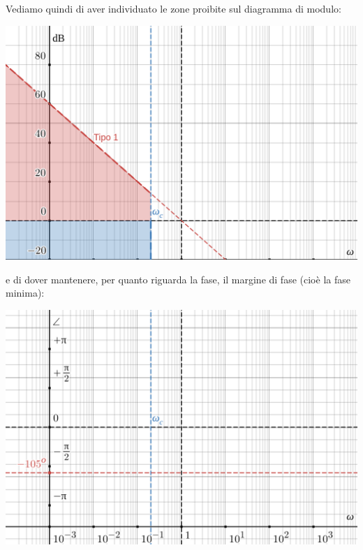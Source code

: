 \documentclass[a4paper,11pt]{article}
\begin{document}
Vediamo quindi di aver individuato le zone proibite sul diagramma di modulo:
\begin{center}
	\includegraphics[scale=0.28]{../figures/crociera_shaping_mod.png}
\end{center}

e di dover mantenere, per quanto riguarda la fase, il margine di fase (cioè la fase minima):
\begin{center}
	\includegraphics[scale=0.28]{../figures/crociera_shaping_phi.png}
\end{center}

\par\smallskip
\end{document}
